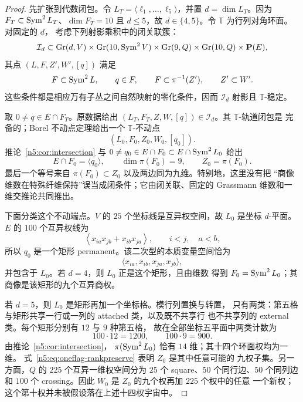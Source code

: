 \begin{proof}
先扩张到代数闭包。令
\(L_T=\langle\ell_1,\ldots,\ell_5\rangle\)，并置
\(d=\dim L_T\)。因为
\(F_T\subset\operatorname{Sym}^2L_T\)、\(\dim F_T=10\) 且 \(d\le5\)，故
\(d\in\{4,5\}\)。令 \(\mathbb T\) 为行列对角环面。对固定的 \(d\)，
考虑下列射影乘积中的闭关联簇：
\[
 \mathcal I_d\subset
 \operatorname{Gr}(d,V)\times\operatorname{Gr}(10,\operatorname{Sym}^2V)
 \times\operatorname{Gr}(9,Q)\times\operatorname{Gr}(10,Q)
 \times\mathbf P(E),
\]
其点 \((L,F,Z',W',[q])\) 满足
\begin{equation}\label{n5:eq:oneflag-incidence}
 F\subset\operatorname{Sym}^2L,\qquad q\in F,\qquad
 F\subset\pi^{-1}(Z'),\qquad Z'\subset W'.
\end{equation}
这些条件都是相应万有子丛之间自然映射的零化条件，因而
\(\mathcal I_d\) 射影且 \(\mathbb T\)-稳定。

取 \(0\ne q\in E\cap F_T\)。原数据给出
\((L_T,F_T,Z,W,[q])\in\mathcal I_d\)。其 \(\mathbb T\)-轨道闭包是
完备的；Borel 不动点定理给出一个 \(\mathbb T\)-不动点
\[
 (L_0,F_0,Z_0,W_0,[q_0]).
\]
推论~\ref{n5:cor:intersection} 与
\(0\ne q_0\in E\cap F_0\subset E\cap\operatorname{Sym}^2L_0\) 给出
\begin{equation}\label{n5:eq:oneflag-rankpreserve}
 E\cap F_0=\langle q_0\rangle,\qquad
 \dim\pi(F_0)=9,\qquad Z_0=\pi(F_0).
\end{equation}
最后一个等号来自
\(\pi(F_0)\subset Z_0\) 以及两边同为九维。特别地，这里没有把
“商像维数在特殊纤维保持”误当成闭条件；它由闭关联、固定的
Grassmann 维数和一维交推论共同推出。

下面分类这个不动端点。\(V\) 的 \(25\) 个坐标线是互异权空间，故
\(L_0\) 是坐标 \(d\)-平面。\(E\) 的 \(100\) 个互异权线为
\[
 \left\langle x_{ia}x_{jb}+x_{ib}x_{ja}\right\rangle,
 \qquad i<j,\quad a<b,
\]
所以 \(q_0\) 是一个矩形 permanent。该二次型的本质变量空间恰为
\[
 \langle x_{ia},x_{ib},x_{ja},x_{jb}\rangle,
\]
并包含于 \(L_0\)。若 \(d=4\)，则 \(L_0\) 正是这个矩形，且由维数
得到 \(F_0=\operatorname{Sym}^2L_0\)；其商像是该矩形的九个互异商权。

若 \(d=5\)，则 \(L_0\) 是矩形再加一个坐标格。模行列置换与转置，
只有两类：第五格与矩形共享一行或一列的 attached 类，以及既不共享行
也不共享列的 external 类。每个矩形分别有 \(12\) 与 \(9\) 种第五格，
故在全部坐标五平面中两类计数为
\begin{equation}\label{n5:eq:oneflag-orbits}
 100\cdot12=1200,\qquad 100\cdot9=900.
\end{equation}
由推论~\ref{n5:cor:intersection}，
\(\pi(\operatorname{Sym}^2L_0)\) 恰有 \(14\) 维；其十四个环面权均为一维。
式~\eqref{n5:eq:oneflag-rankpreserve} 表明 \(Z_0\) 是其中任意可能的
九权子集。另一方面，\(Q\) 的 \(225\) 个互异一维权空间分为
\(25\) 个 square、\(50\) 个同行边、\(50\) 个同列边和 \(100\) 个
crossing。因此 \(W_0\) 是 \(Z_0\) 的九个权再加 \(225\) 个权中的任意
一个新权；这个第十权并未被假设落在上述十四权宇宙中。


\end{proof}
